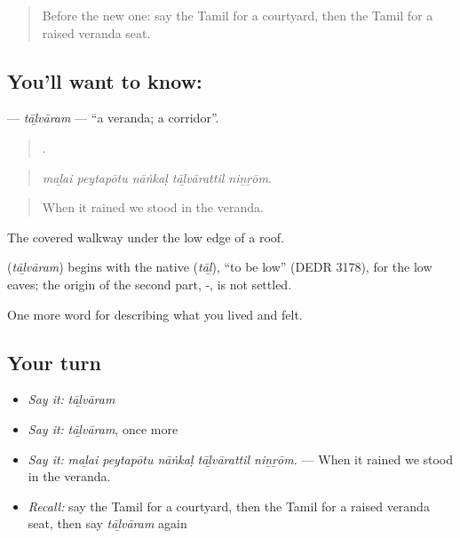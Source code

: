 \label{lesson:TA-C522-talvaram}



\begin{quote}
Before the new one: say the Tamil for a courtyard, then the Tamil for a raised veranda seat.
\end{quote}

\subsection*{You'll want to know: }
\textbf{} — \emph{tāḻvāram} — \textquotedblleft{}a veranda; a corridor\textquotedblright{}.

\begin{quote}
    .
\end{quote}

\begin{quote}
\emph{maḻai peytapōtu nāṅkaḷ tāḻvārattil niṉṟōm.}
\end{quote}

\begin{quote}
When it rained we stood in the veranda.
\end{quote}

The covered walkway under the low edge of a roof.

\begin{cousinweb}
\textbf{} (\emph{tāḻvāram}) begins with the native  (\emph{tāḻ}), \textquotedblleft{}to be low\textquotedblright{} (DEDR 3178), for the low eaves; the origin of the second part, -, is not settled.
\end{cousinweb}

\begin{grammarlens}[title={What you've built}]
One more word for describing what you lived and felt.
\end{grammarlens}

\subsection*{Your turn}
\begin{itemize}
\raggedright
  \item \emph{Say it:} \emph{tāḻvāram}
  \item \emph{Say it:} \emph{tāḻvāram}, once more
  \item \emph{Say it:} \emph{maḻai peytapōtu nāṅkaḷ tāḻvārattil niṉṟōm.} — When it rained we stood in the veranda.
  \item \emph{Recall:} say the Tamil for a courtyard, then the Tamil for a raised veranda seat, then say \emph{tāḻvāram} again
\end{itemize}


